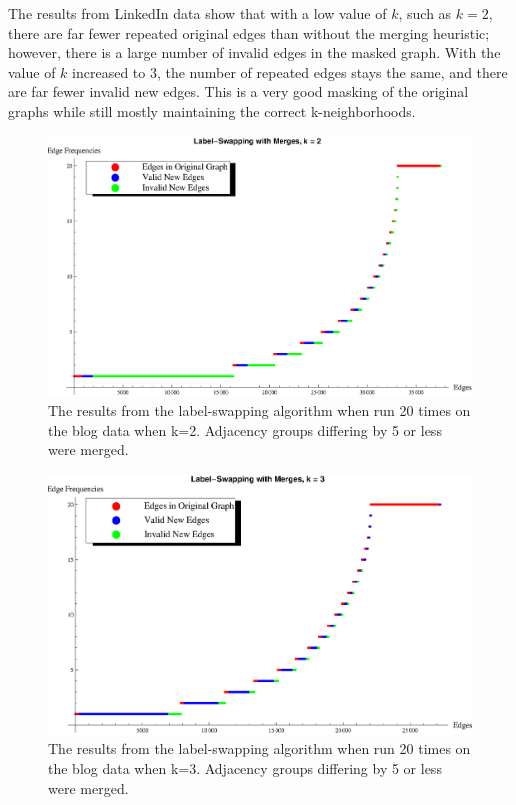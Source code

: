 \indent The results from LinkedIn data show that with a low value of $k$, such as $k=2$, there are far fewer repeated original edges than without the merging heuristic; however, there is a large number of invalid edges in the masked graph. With the value of $k$ increased to $3$, the number of repeated edges stays the same, and there are far fewer invalid new edges. This is a very good masking of the original graphs while still mostly maintaining the correct k-neighborhoods. \\

\begin{figure}[ht]
\centerline{ \includegraphics[scale=0.5 ]{s40_k_2_det_graph.eps}}
  \caption{The results from the label-swapping algorithm when run 20 times on the blog data when k=2. Adjacency groups differing by 5 or less were merged.}
  \label{fig:s40-k=2-merge}
\end{figure}

\begin{figure}[ht]
\centerline{\includegraphics[scale=0.5]{s40_k_3_det_graph.eps}}
  \caption{The results from the label-swapping algorithm when run 20 times on the blog data when k=3. Adjacency groups differing by 5 or less were merged.}
  \label{fig:s40-k=3-merge}
\end{figure}
